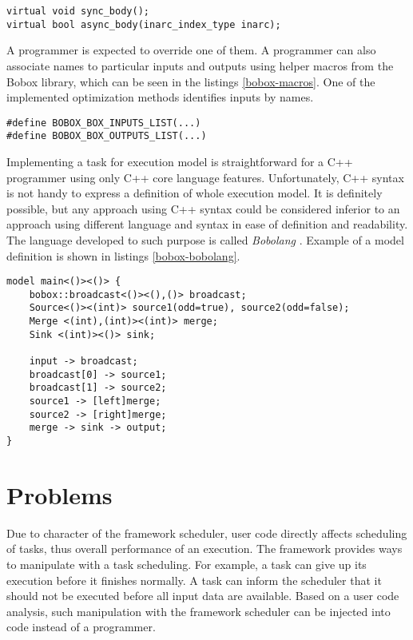 \begin{lstlisting}[caption={Code representation of box action step.},label={bobox-action-step}]
virtual void sync_body();
virtual bool async_body(inarc_index_type inarc);
\end{lstlisting}

A programmer is expected to override one of them. A programmer can also associate names to particular inputs and outputs using helper macros from the Bobox library, which can be seen in the listings \ref{bobox-macros}. One of the implemented optimization methods identifies inputs by names.

\begin{lstlisting}[caption={Helper macros for mapping of names to inputs and outputs.},label={bobox-macros}]
#define BOBOX_BOX_INPUTS_LIST(...)
#define BOBOX_BOX_OUTPUTS_LIST(...)
\end{lstlisting}

Implementing a task for execution model is straightforward for a C++ programmer using only C++ core language features. Unfortunately, C++ syntax is not handy to express a definition of whole execution model. It is definitely possible, but any approach using C++ syntax could be considered inferior to an approach using different language and syntax in ease of definition and readability. The language developed to such purpose is called \emph{Bobolang} \cite{bobolang}. Example of a model definition is shown in listings \ref{bobox-bobolang}.

\begin{lstlisting}[caption={Example of Bobolang usage from Bobox project.}, label={bobox-bobolang}]
model main<()><()> {
	bobox::broadcast<()><(),()> broadcast;
	Source<()><(int)> source1(odd=true), source2(odd=false);
	Merge <(int),(int)><(int)> merge;
	Sink <(int)><()> sink;
	
	input -> broadcast;
	broadcast[0] -> source1;
	broadcast[1] -> source2;
	source1 -> [left]merge;
	source2 -> [right]merge;
	merge -> sink -> output;
}
\end{lstlisting}

\section{Problems}
Due to character of the framework scheduler, user code directly affects scheduling of tasks, thus overall performance of an execution. The framework provides ways to manipulate with a task scheduling. For example, a task can give up its execution before it finishes normally. A task can inform the scheduler that it should not be executed before all input data are available. Based on a user code analysis, such manipulation with the framework scheduler can be injected into code instead of a programmer.
